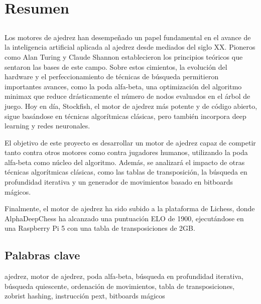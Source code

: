 \chapter*{Resumen}

\section*{\tituloPortadaVal}

Los motores de ajedrez han desempeñado un papel fundamental en el avance de la inteligencia artificial aplicada al ajedrez desde mediados del siglo XX. Pioneros como Alan Turing y Claude Shannon establecieron los principios teóricos que sentaron las bases de este campo. Sobre estos cimientos, la evolución del hardware y el perfeccionamiento de técnicas de búsqueda permitieron importantes avances, como la poda alfa-beta, una optimización del algoritmo minimax que reduce drásticamente el número de nodos evaluados en el árbol de juego. Hoy en día, Stockfish, el motor de ajedrez más potente y de código abierto, sigue basándose en técnicas algorítmicas clásicas, pero también incorpora deep learning y redes neuronales.

\vspace{1em}

El objetivo de este proyecto es desarrollar un motor de ajedrez capaz de competir tanto contra otros motores como contra jugadores humanos, utilizando la poda alfa-beta como núcleo del algoritmo. Además, se analizará el impacto de otras técnicas algorítmicas clásicas, como las tablas de transposición, la búsqueda en profundidad iterativa y un generador de movimientos basado en bitboards mágicos.

\vspace{1em}

Finalmente, el motor de ajedrez ha sido subido a la plataforma de Lichess, donde AlphaDeepChess ha alcanzado una puntuación ELO de 1900, ejecutándose en una Raspberry Pi 5 con una tabla de transposiciones de 2GB.

\section*{Palabras clave}
   
\noindent ajedrez, motor de ajedrez, poda alfa-beta, búsqueda en profundidad iterativa, búsqueda quiescente, ordenación de movimientos, tabla de transposiciones, zobrist hashing, instrucción pext, bitboards mágicos 
